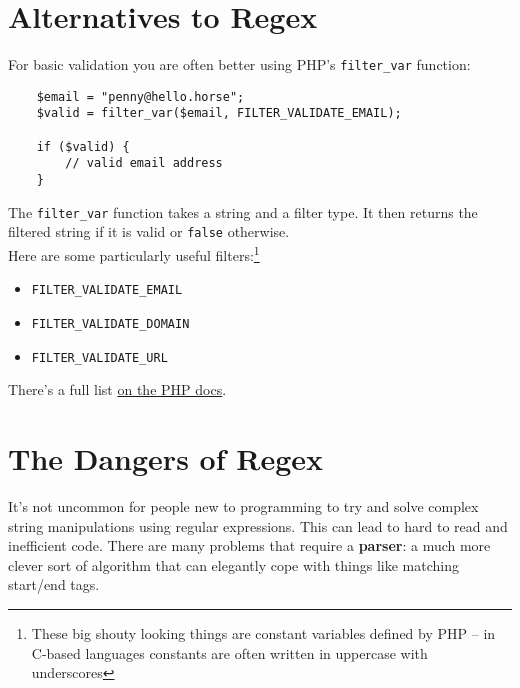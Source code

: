 \section{Alternatives to Regex}

For basic validation you are often better using PHP's \texttt{filter\_var} function:

\begin{verbatim}
    $email = "penny@hello.horse";
    $valid = filter_var($email, FILTER_VALIDATE_EMAIL);

    if ($valid) {
        // valid email address
    }
\end{verbatim}

The \texttt{filter\_var} function takes a string and a filter type. It then returns the filtered string if it is valid or \texttt{false} otherwise.
\\

Here are some particularly useful filters:\footnote{These big shouty looking things are constant variables defined by PHP – in C-based languages constants are often written in uppercase with underscores}

\begin{itemize}
    \item \texttt{FILTER\_VALIDATE\_EMAIL}
    \item \texttt{FILTER\_VALIDATE\_DOMAIN}
    \item \texttt{FILTER\_VALIDATE\_URL}
\end{itemize}

There's a full list \href{https://www.php.net/manual/en/filter.filters.validate.php}{on the PHP docs}.



\section{The Dangers of Regex}


It's not uncommon for people new to programming to try and solve complex string manipulations using regular expressions. This can lead to hard to read and inefficient code. There are many problems that require a \textbf{parser}: a much more clever sort of algorithm that can elegantly cope with things like matching start/end tags.
\\

